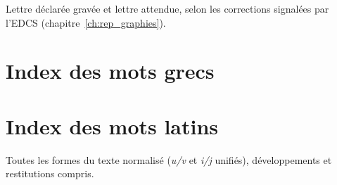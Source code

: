 Lettre déclarée gravée et lettre attendue, selon les corrections signalées par l’EDCS (chapitre~\ref{ch:rep_graphies}).



\section{Index des mots grecs}



\section{Index des mots latins}

Toutes les formes du texte normalisé (\emph{u/v} et \emph{i/j} unifiés), développements et restitutions compris.


